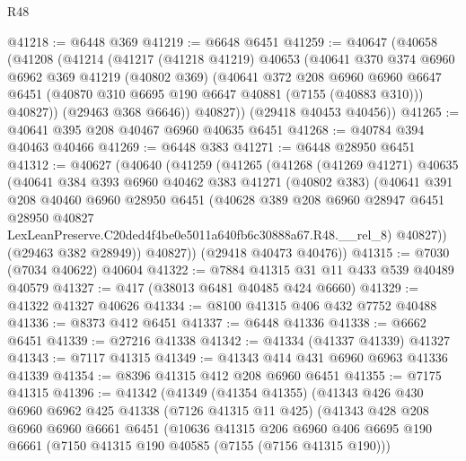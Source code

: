 \begin{lexlean}{R48}
\begin{coremodule}
@41218 := @6448 @369
@41219 := @6648 @6451
@41259 := @40647
    (@40658
      (@41208
        (@41214
          (@41217
            (@41218 @41219)
            @40653
            (@40641
              @370
              @374
              @6960
              @6962
              @369
              @41219
              (@40802 @369)
              (@40641
                @372
                @208
                @6960
                @6960
                @6647
                @6451
                (@40870 @310 @6695 @190 @6647 @40881 (@7155 (@40883 @310)))
                @40827))
            (@29463 @368 @6646))
          @40827))
      (@29418 @40453 @40456))
@41265 := @40641 @395 @208 @40467 @6960 @40635 @6451
@41268 := @40784 @394 @40463 @40466
@41269 := @6448 @383
@41271 := @6448 @28950 @6451
@41312 := @40627
    (@40640
      (@41259
        (@41265
          (@41268
            (@41269 @41271)
            @40635
            (@40641
              @384
              @393
              @6960
              @40462
              @383
              @41271
              (@40802 @383)
              (@40641
                @391
                @208
                @40460
                @6960
                @28950
                @6451
                (@40628
                  @389
                  @208
                  @6960
                  @28947
                  @6451
                  @28950
                  @40827
                  LexLeanPreserve.C20ded4f4be0e5011a640fb6c30888a67.R48.__rel_8)
                @40827))
            (@29463 @382 @28949))
          @40827))
      (@29418 @40473 @40476))
@41315 := @7030 (@7034 @40622) @40604
@41322 := @7884 @41315 @31 @11 @433 @539 @40489 @40579
@41327 := @417 (@38013 @6481 @40485 @424 @6660)
@41329 := @41322 @41327 @40626
@41334 := @8100 @41315 @406 @432 @7752 @40488
@41336 := @8373 @412 @6451
@41337 := @6448 @41336
@41338 := @6662 @6451
@41339 := @27216 @41338
@41342 := @41334 (@41337 @41339) @41327
@41343 := @7117 @41315
@41349 := @41343 @414 @431 @6960 @6963 @41336 @41339
@41354 := @8396 @41315 @412 @208 @6960 @6451
@41355 := @7175 @41315
@41396 := @41342
    (@41349
      (@41354 @41355)
      (@41343
        @426
        @430
        @6960
        @6962
        @425
        @41338
        (@7126 @41315 @11 @425)
        (@41343
          @428
          @208
          @6960
          @6960
          @6661
          @6451
          (@10636
            @41315
            @206
            @6960
            @406
            @6695
            @190
            @6661
            (@7150 @41315 @190 @40585 (@7155 (@7156 @41315 @190)))

\end{coremodule}
\end{lexlean}
